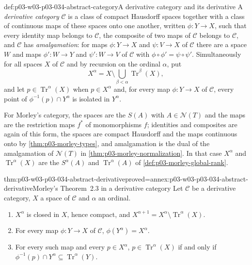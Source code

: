 \begin{hbdefinition}{def:p03-w03-p03-034-abstract-category}{A derivative category and its derivative}
A \emph{derivative category} \(\mathcal C\) is a class of compact
Hausdorff spaces together with a class of continuous maps of these spaces
onto one another, written \(\phi:Y\to X\), such that every identity map
belongs to \(\mathcal C\), the composite of two maps of \(\mathcal C\)
belongs to \(\mathcal C\), and \(\mathcal C\) has \emph{amalgamation}: for
maps \(\phi:Y\to X\) and \(\psi:V\to X\) of \(\mathcal C\) there are a
space \(W\) and maps \(\phi':W\to Y\) and \(\psi':W\to V\) of
\(\mathcal C\) with \(\phi\circ\phi'=\psi\circ\psi'\). Simultaneously for
all spaces \(X\) of \(\mathcal C\) and by recursion on the ordinal
\(\alpha\), put
\[
 X^\alpha=X\setminus\bigcup_{\beta<\alpha}\operatorname{Tr}^\beta(X),
\]
and let \(p\in\operatorname{Tr}^\alpha(X)\) when \(p\in X^\alpha\) and,
for every map \(\phi:Y\to X\) of \(\mathcal C\), every point of
\(\phi^{-1}(p)\cap Y^\alpha\) is isolated in \(Y^\alpha\).
\end{hbdefinition}

For Morley's category, the spaces are the \(S(A)\) with
\(A\in\mathcal N(T)\) and the maps are the restriction maps \(f^*\) of
monomorphisms \(f\); identities and composites are again of this form, the
spaces are compact Hausdorff and the maps continuous onto by
\cref{thm:p03-morley-types}, and amalgamation is the dual of the
amalgamation of \(\mathcal N(T)\) in \cref{thm:p03-morley-normalization}.
In that case \(X^\alpha\) and \(\operatorname{Tr}^\alpha(X)\) are the
\(S^\alpha(A)\) and \(\operatorname{Tr}^\alpha(A)\) of
\cref{def:p03-morley-global-rank}.

\begin{hbtheorem}{thm:p03-w03-p03-034-abstract-derivative}{proved=annex:p03-w03-p03-034-abstract-derivative}{Morley's Theorem~2.3 in a derivative category}
Let \(\mathcal C\) be a derivative category, \(X\) a space of
\(\mathcal C\) and \(\alpha\) an ordinal.
\begin{enumerate}
\item \(X^\alpha\) is closed in \(X\), hence compact, and
\(X^{\alpha+1}=X^\alpha\setminus\operatorname{Tr}^\alpha(X)\).
\item For every map \(\phi:Y\to X\) of \(\mathcal C\),
\(\phi(Y^\alpha)=X^\alpha\).
\item For every such map and every \(p\in X^\alpha\),
\(p\in\operatorname{Tr}^\alpha(X)\) if and only if
\(\phi^{-1}(p)\cap Y^\alpha\subseteq\operatorname{Tr}^\alpha(Y)\).
\end{enumerate}
\end{hbtheorem}

